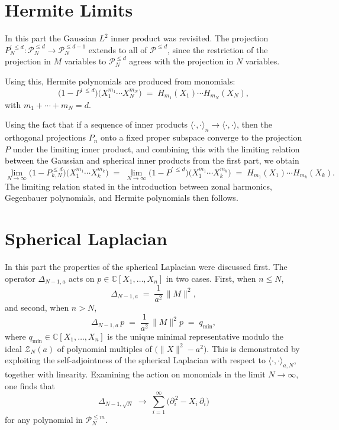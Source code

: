 \documentclass[11pt]{article}
\begin{document}
\section*{Hermite Limits}

In this part the Gaussian $L^2$ inner product was revisited. The projection
$P_N^{\prime\,\le d} : \mathcal{P}_N^{\le d} \to \mathcal{P}_N^{\le d - 1}$
extends to all of $\mathcal{P}^{\le d}$, since the restriction of the
projection in $M$ variables to $\mathcal{P}_N^{\le d}$ agrees with the
projection in $N$ variables.

Using this, Hermite polynomials are produced from monomials:
\[
  \bigl(1 - P^{\prime\,\le d}\bigr)\bigl(X_1^{m_1}\!\cdots X_N^{m_N}\bigr)
  \;=\; H_{m_1}(X_1) \cdots H_{m_N}(X_N),
\]
with $m_1 + \cdots + m_N = d$.

Using the fact that if a sequence of inner products
$\langle\cdot,\cdot\rangle_n \to \langle\cdot,\cdot\rangle$, then the
orthogonal projections $P_n$ onto a fixed proper subspace converge to the
projection $P$ under the limiting inner product, and combining this with the
limiting relation between the Gaussian and spherical inner products from the
first part, we obtain
\[
  \lim_{N\to\infty}\!\bigl(1 - P_{k,N}^{\le d}\bigr)\bigl(X_1^{m_1} \cdots X_k^{m_k}\bigr)
  \;=\; \lim_{N\to\infty}\!\bigl(1 - P^{\prime\,\le d}\bigr)\bigl(X_1^{m_1} \cdots X_k^{m_k}\bigr)
  \;=\; H_{m_1}(X_1) \cdots H_{m_k}(X_k).
\]
The limiting relation stated in the introduction between zonal harmonics,
Gegenbauer polynomials, and Hermite polynomials then follows.

\section*{Spherical Laplacian}

In this part the properties of the spherical Laplacian were discussed first.
The operator $\Delta_{N-1,a}$ acts on $p \in \mathbb{C}[X_1, \ldots, X_n]$ in
two cases. First, when $n \le N$,
\[
  \Delta_{N-1,a} \;=\; \frac{1}{a^2}\,\|M\|^2,
\]
and second, when $n > N$,
\[
  \Delta_{N-1,a}\, p \;=\; \frac{1}{a^2}\,\|M\|^2 p \;=\; q_{\min},
\]
where $q_{\min} \in \mathbb{C}[X_1, \ldots, X_n]$ is the unique minimal
representative modulo the ideal $\mathcal{Z}_N(a)$ of polynomial multiples of
$\bigl(\|X\|^2 - a^2\bigr)$. This is demonstrated by exploiting the
self-adjointness of the spherical Laplacian with respect to
$\langle\cdot,\cdot\rangle_{a,N}$, together with linearity. Examining the
action on monomials in the limit $N \to \infty$, one finds that
\[
  \Delta_{N-1,\sqrt{N}}
  \;\longrightarrow\;
  \sum_{i=1}^{\infty}\bigl(\partial_i^{\,2} - X_i\,\partial_i\bigr)
\]
for any polynomial in $\mathcal{P}_N^{\le m}$.
\end{document}
